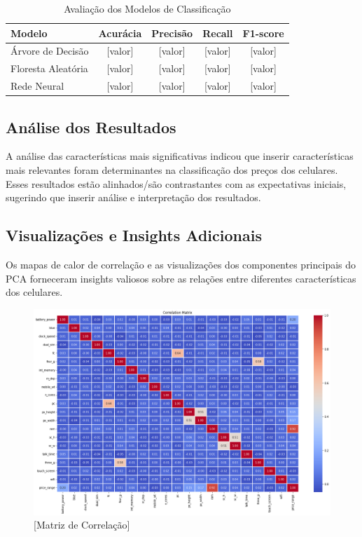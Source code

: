 \documentclass[conference]{IEEEtran}
\begin{document}
\begin{table}[h]
\centering
\caption{Avaliação dos Modelos de Classificação}
\begin{tabular}{|l|c|c|c|c|}
\hline
Modelo & Acurácia & Precisão & Recall & F1-score \\
\hline
Árvore de Decisão & [valor] & [valor] & [valor] & [valor] \\
Floresta Aleatória & [valor] & [valor] & [valor] & [valor] \\
Rede Neural & [valor] & [valor] & [valor] & [valor] \\
\hline
\end{tabular}
\end{table}

\subsection{Análise dos Resultados}

A análise das características mais significativas indicou que 
inserir características mais relevantes foram determinantes 
na classificação dos preços dos celulares. 
Esses resultados estão alinhados/são contrastantes com as expectativas iniciais, 
sugerindo que inserir análise e interpretação dos resultados.

\subsection{Visualizações e Insights Adicionais}

Os mapas de calor de correlação e as visualizações dos componentes principais do PCA 
forneceram insights valiosos sobre as relações entre diferentes características 
dos celulares. 

\begin{figure}[htbp]
    \centerline{\includegraphics[scale=0.2]{matrix_correlation.png}}
    \caption{[Matriz de Correlação]}
    \label{fig:imagem1}
\end{figure}
\end{document}
